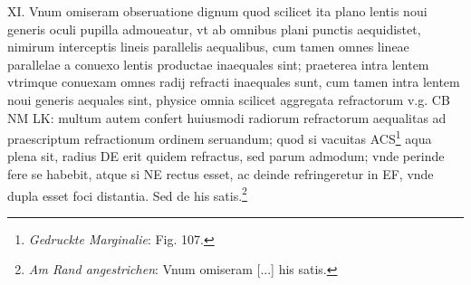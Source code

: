 \pend \pstart [p.~138] XI. Vnum omiseram obseruatione dignum quod  scilicet ita plano lentis\protect{} noui generis oculi\protect{} pupilla\protect{} admoueatur, vt ab omnibus plani punctis aequidistet, nimirum interceptis lineis parallelis aequalibus, cum tamen  omnes lineae parallelae a conuexo lentis\protect{} productae inaequales sint; praeterea intra lentem\protect{} vtrimque conuexam omnes radij refracti\protect{} inaequales sunt, cum tamen intra lentem\protect{} noui generis aequales sint, physice omnia scilicet  aggregata refractorum v.g. CB NM LK: multum  autem confert huiusmodi radiorum refractorum\protect{} aequalitas ad praescriptum refractionum\protect{} ordinem seruandum;  quod si vacuitas ACS\footnote{\textit{Gedruckte Marginalie}: Fig. 107.} aqua plena sit, radius DE erit  quidem refractus, sed parum admodum; vnde perinde  fere se habebit, atque si NE rectus esset, ac deinde refringeretur in EF, vnde dupla esset foci\protect{} distantia. Sed  de his satis.\footnote{\textit{Am Rand angestrichen}: Vnum omiseram [...] his satis.}
